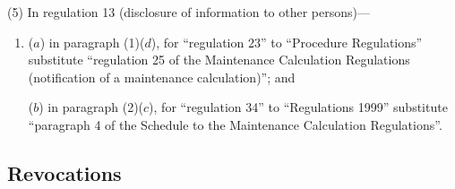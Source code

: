 \documentclass[12pt,a4paper]{article}
\begin{document}
(5) In regulation 13 (disclosure of information to other persons)—
\begin{enumerate}\item[]
($a$) in paragraph (1)($d$), for “regulation 23” to “Procedure Regulations” substitute “regulation 25 of the Maintenance Calculation Regulations (notification of a maintenance calculation)”; and

($b$) in paragraph (2)($c$), for “regulation 34” to “Regulations 1999” substitute “paragraph 4 of the Schedule to the Maintenance Calculation Regulations”.
\end{enumerate}


%
%
%

\subsection[10. Revocations]{Revocations}
\end{document}
